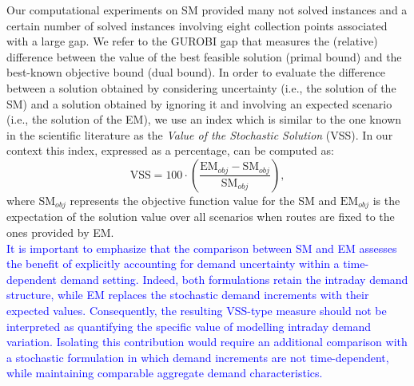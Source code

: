 \documentclass[authoryear,preprint,12pt]{elsarticle}
\newcommand{\rev}[1]{\textcolor{blue}{{#1}}}
\begin{document}
Our computational experiments on SM provided many not solved instances and a certain number of solved instances involving eight collection points associated with a large gap. 
We refer to the GUROBI gap that measures the (relative) difference between the value of the best feasible solution (primal bound) and the best-known objective bound (dual bound). In order to evaluate the difference between a solution obtained by considering uncertainty (i.e., the solution of the SM) and a solution obtained by ignoring it and involving an expected scenario (i.e., the solution of the EM), we use an index which is similar to the one known in the scientific literature as the \textit{Value of the Stochastic Solution} (VSS). In our context this index, expressed as a percentage, can be computed as:
\begin{equation}\label{VSS}
 \text{VSS} = 100 \cdot \left( \frac{\text{EM}_{obj} - \text{SM}_{obj}}{\text{SM}_{obj}} \right),
\end{equation}
where $\text{SM}_{obj}$ represents the objective function value for the SM and $\text{EM}_{obj}$ is the expectation of the solution value over all scenarios when routes are fixed to the ones provided by EM.\\ 


\rev{It is important to emphasize that the comparison between SM and EM assesses the benefit of explicitly accounting for demand uncertainty within a time-dependent demand setting. Indeed, both formulations retain the intraday demand structure, while EM replaces the stochastic demand increments with their expected values. Consequently, the resulting VSS-type measure should not be interpreted as quantifying the specific value of modelling intraday demand variation. Isolating this contribution would require an additional comparison with a stochastic formulation in which demand increments are not time-dependent, while maintaining comparable aggregate demand characteristics.}



\end{document}
